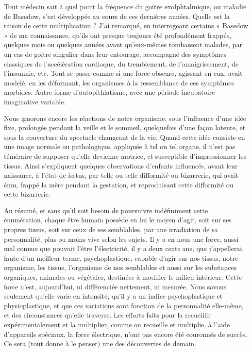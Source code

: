 \documentclass[french,twoside]{book} %
\begin{document}
Tout médecin sait à quel point la fréquence du goitre exolphtalmique, ou maladie de Basedow, s’est développée au cours de ces dernières années. Quelle est la raison de cette multiplication ? J’ai remarqué, en interrogeant certains « Basedow » de ma connaissance, qu’ils ont presque toujours été profondément frappés, quelques mois ou quelques années avant qu’eux-mêmes tombassent malades, par un cas de goitre singulier dans leur entourage, accompagné des symptômes classiques de l’accélération cardiaque, du tremblement, de l’amaigrissement, de l’insomnie, etc. Tout se passe comme si une force obscure, agissant en eux, avait modelé, en les déformant, les organismes à la ressemblance de ces symptômes morbides. Autre forme d’autopithiatisme, avec une période incubatoire imaginative variable.\par
Nous ignorons encore les réactions de notre organisme, sous l’influence d’une idée fixe, prolongée pendant la veille et le sommeil, quelquefois d’une façon latente, et sous la couverture du spectacle changeant de la vie. Quand cette idée consiste en une image normale ou pathologique, appliquée à tel ou tel organe, il n’est pas téméraire de supposer qu’elle devienne motrice, et susceptible d’impressionner les tissus. Ainsi s’expliquent quelques observations d’enfants influencés, avant leur naissance, à l’état de fœtus, par telle ou telle difformité ou bizarrerie, qui avait ému, frappé la mère pendant la gestation, et reproduisant cette difformité ou cette bizarrerie.\par
Au résumé, et sans qu’il soit besoin de poursuivre indéfiniment cette énumération, chaque être humain possède en lui le moyen d’agir, soit sur ses propres tissus, soit sur ceux de ses semblables, par une irradiation de sa personnalité, plus ou moins vive selon les sujets. Il y a en nous une force, aussi mal connue que pouvait l’être l’électricité, il y a deux cents ans, que j’appellerai, faute d’un meilleur terme, psychoplastique, capable d’agir sur nos tissus, notre organisme, les tissus, l’organisme de nos semblables et aussi sur les substances organiques, animales ou végétales, destinées à modifier le milieu intérieur. Cette force n’est, aujourd’hui, ni différenciée nettement, ni mesurée. Nous savons seulement qu’elle varie en intensité, qu’il y a un indice psychoplastique et physioplastique, et que ces variations sont fonction de la personnalité elle-même, et des circonstances qu’elle traverse. Les efforts faits pour la recueillir expérimentalement et la multiplier, comme on recueille et multiplie, à l’aide d’appareils spéciaux, la force électrique, n’ont pas encore été couronnés de succès. Ce sera (tout donne à le penser) une des découvertes de demain.\par
\end{document}
